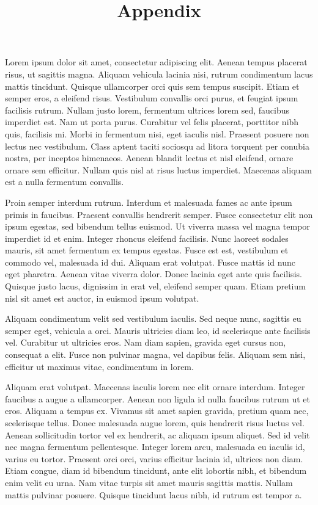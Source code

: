 \documentclass{article}
\begin{document}
\title{Appendix}

\maketitle


Lorem ipsum dolor sit amet, consectetur adipiscing elit. Aenean tempus placerat risus, ut sagittis magna. Aliquam vehicula lacinia nisi, rutrum condimentum lacus mattis tincidunt. Quisque ullamcorper orci quis sem tempus suscipit. Etiam et semper eros, a eleifend risus. Vestibulum convallis orci purus, et feugiat ipsum facilisis rutrum. Nullam justo lorem, fermentum ultrices lorem sed, faucibus imperdiet est. Nam ut porta purus. Curabitur vel felis placerat, porttitor nibh quis, facilisis mi. Morbi in fermentum nisi, eget iaculis nisl. Praesent posuere non lectus nec vestibulum. Class aptent taciti sociosqu ad litora torquent per conubia nostra, per inceptos himenaeos. Aenean blandit lectus et nisl eleifend, ornare ornare sem efficitur. Nullam quis nisl at risus luctus imperdiet. Maecenas aliquam est a nulla fermentum convallis.


Proin semper interdum rutrum. Interdum et malesuada fames ac ante ipsum primis in faucibus. Praesent convallis hendrerit semper. Fusce consectetur elit non ipsum egestas, sed bibendum tellus euismod. Ut viverra massa vel magna tempor imperdiet id et enim. Integer rhoncus eleifend facilisis. Nunc laoreet sodales mauris, sit amet fermentum ex tempus egestas. Fusce est est, vestibulum et commodo vel, malesuada id dui. Aliquam erat volutpat. Fusce mattis id nunc eget pharetra. Aenean vitae viverra dolor. Donec lacinia eget ante quis facilisis. Quisque justo lacus, dignissim in erat vel, eleifend semper quam. Etiam pretium nisl sit amet est auctor, in euismod ipsum volutpat.


Aliquam condimentum velit sed vestibulum iaculis. Sed neque nunc, sagittis eu semper eget, vehicula a orci. Mauris ultricies diam leo, id scelerisque ante facilisis vel. Curabitur ut ultricies eros. Nam diam sapien, gravida eget cursus non, consequat a elit. Fusce non pulvinar magna, vel dapibus felis. Aliquam sem nisi, efficitur ut maximus vitae, condimentum in lorem.


Aliquam erat volutpat. Maecenas iaculis lorem nec elit ornare interdum. Integer faucibus a augue a ullamcorper. Aenean non ligula id nulla faucibus rutrum ut et eros. Aliquam a tempus ex. Vivamus sit amet sapien gravida, pretium quam nec, scelerisque tellus. Donec malesuada augue lorem, quis hendrerit risus luctus vel. Aenean sollicitudin tortor vel ex hendrerit, ac aliquam ipsum aliquet. Sed id velit nec magna fermentum pellentesque. Integer lorem arcu, malesuada eu iaculis id, varius eu tortor. Praesent orci orci, varius efficitur lacinia id, ultrices non diam. Etiam congue, diam id bibendum tincidunt, ante elit lobortis nibh, et bibendum enim velit eu urna. Nam vitae turpis sit amet mauris sagittis mattis. Nullam mattis pulvinar posuere. Quisque tincidunt lacus nibh, id rutrum est tempor a.
\end{document}
